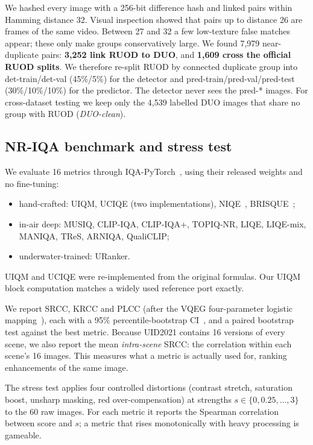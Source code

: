 \documentclass[conference]{IEEEtran}
\begin{document}
We hashed every image with a 256-bit difference hash and linked pairs within Hamming distance 32. Visual inspection showed that pairs up to distance 26 are frames of the same video. Between 27 and 32 a few low-texture false matches appear; these only make groups conservatively large. We found 7{,}979 near-duplicate pairs: \textbf{3{,}252 link RUOD to DUO}, and \textbf{1{,}609 cross the official RUOD splits}. We therefore re-split RUOD by connected duplicate group into det-train/det-val (45\%/5\%) for the detector and pred-train/pred-val/pred-test (30\%/10\%/10\%) for the predictor. The detector never sees the pred-* images. For cross-dataset testing we keep only the 4{,}539 labelled DUO images that share no group with RUOD (\emph{DUO-clean}).

\subsection{NR-IQA benchmark and stress test}
We evaluate 16 metrics through IQA-PyTorch~\cite{chen2022iqapytorch}, using their released weights and no fine-tuning:
\begin{itemize}
\item hand-crafted: UIQM, UCIQE (two implementations), NIQE~\cite{mittal2013niqe}, BRISQUE~\cite{mittal2012brisque};
\item in-air deep: MUSIQ, CLIP-IQA, CLIP-IQA+, TOPIQ-NR, LIQE, LIQE-mix, MANIQA, TReS, ARNIQA, QualiCLIP;
\item underwater-trained: URanker.
\end{itemize}
UIQM and UCIQE were re-implemented from the original formulas. Our UIQM block computation matches a widely used reference port exactly.

We report SRCC, KRCC and PLCC (after the VQEG four-parameter logistic mapping~\cite{vqeg2000}), each with a 95\% percentile-bootstrap CI~\cite{efron1994bootstrap}, and a paired bootstrap test against the best metric. Because UID2021 contains 16 versions of every scene, we also report the mean \emph{intra-scene} SRCC: the correlation within each scene's 16 images. This measures what a metric is actually used for, ranking enhancements of the same image.

The stress test applies four controlled distortions (contrast stretch, saturation boost, unsharp masking, red over-compensation) at strengths $s\in\{0,0.25,\dots,3\}$ to the 60 raw images. For each metric it reports the Spearman correlation between score and $s$; a metric that rises monotonically with heavy processing is gameable.
\end{document}
